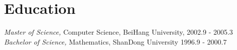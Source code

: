 
\section{Education}

{\em Master of Science,} Computer Science, BeiHang University, \hfill 2002.9 - 2005.3
\\
{\em Bachelor of Science,} Mathematics, ShanDong University \hfill 1996.9 - 2000.7

